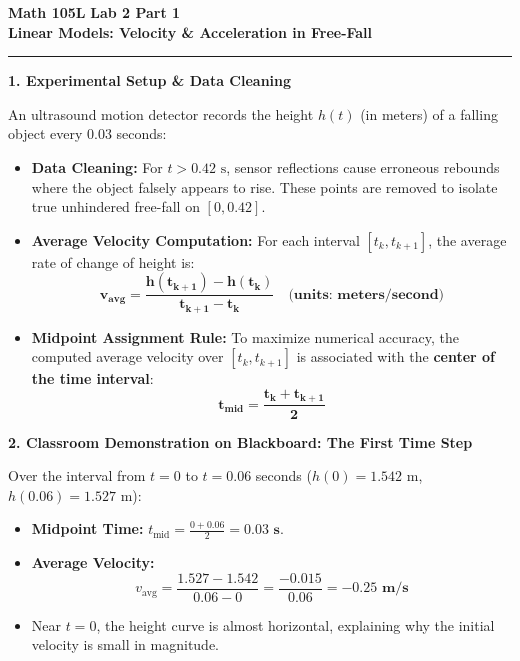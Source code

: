 \documentclass[10.5pt]{article}
\begin{document}
\noindent \textbf{\large Math 105L} \hfill \textbf{\large Lab 2 Part 1}\\[1pt]
{\textbf{\Large Linear Models: Velocity \& Acceleration in Free-Fall}}\\[-5pt]
\rule{\textwidth}{1.2pt}

\vspace{0.03in}

\textbf{\large 1. Experimental Setup \& Data Cleaning}

An ultrasound motion detector records the height $h(t)$ (in meters) of a falling object every $0.03$ seconds:
\begin{itemize}[leftmargin=1.2em, topsep=1pt, itemsep=2pt]
  \item \textbf{Data Cleaning:} For $t > 0.42\text{ s}$, sensor reflections cause erroneous rebounds where the object falsely appears to rise. These points are removed to isolate true unhindered free-fall on $[0, 0.42]$.
  \item \textbf{Average Velocity Computation:} For each interval $[t_k, t_{k+1}]$, the average rate of change of height is:
  \[
    \mathbf{v_{\text{avg}} = \frac{h(t_{k+1}) - h(t_k)}{t_{k+1} - t_k} \quad \text{(units: meters/second)}}
  \]
  \item \textbf{Midpoint Assignment Rule:} To maximize numerical accuracy, the computed average velocity over $[t_k, t_{k+1}]$ is associated with the \textbf{center of the time interval}:
  \[
    \mathbf{t_{\text{mid}} = \frac{t_k + t_{k+1}}{2}}
  \]
\end{itemize}

\vspace{0.03in}

\textbf{\large 2. Classroom Demonstration on Blackboard: The First Time Step}

Over the interval from $t = 0$ to $t = 0.06$ seconds ($h(0) = 1.542\text{ m}$, $h(0.06) = 1.527\text{ m}$):
\begin{itemize}[leftmargin=1.2em, topsep=1pt, itemsep=3pt]
  \item \textbf{Midpoint Time:} $t_{\text{mid}} = \frac{0 + 0.06}{2} = \mathbf{0.03\text{ s}}$.
  \item \textbf{Average Velocity:}
  \[
    v_{\text{avg}} = \frac{1.527 - 1.542}{0.06 - 0} = \frac{-0.015}{0.06} = \mathbf{-0.25\text{ m/s}}
  \]
  \item Near $t = 0$, the height curve is almost horizontal, explaining why the initial velocity is small in magnitude.
\end{itemize}
\end{document}
